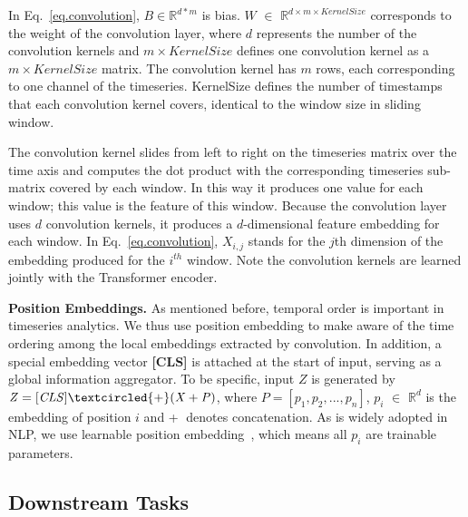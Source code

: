 \begin{sloppypar}

In Eq.~\ref{eq.convolution}, $B \in \mathbb{R}^{d*m}$ is bias. $W$ $\in$ $\mathbb{R}^{d \times m \times KernelSize}$ corresponds to the weight of the convolution layer, where $d$ represents the number of the convolution kernels and $m \times KernelSize$ defines one convolution kernel as a $m \times KernelSize$ matrix. The convolution kernel has $m$ rows, each corresponding to one channel of the timeseries. KernelSize defines the number of timestamps that each convolution kernel covers, identical to the window size in sliding window.  

The convolution kernel slides from left to right on the timeseries matrix over the time axis and computes the dot product with the corresponding timeseries sub-matrix covered by each window. In this way it produces one value for each window;  this value is the feature of this window. 
Because the convolution layer uses $d$ convolution kernels, it produces a $d$-dimensional feature embedding for each window. In Eq.~\ref{eq.convolution}, $X_{i,j}$ stands for the $j$th dimension of the embedding produced for the $i^{th}$ window.
Note the convolution kernels are learned jointly with the Transformer encoder. 

\noindent\textbf{Position Embeddings.}
As mentioned before, temporal order is important in timeseries analytics. We thus use position embedding to make \system aware of the time ordering among the local embeddings extracted by convolution. 
In addition, a special embedding vector \textbf{[CLS]} is attached at the start of input, serving as a global information aggregator.  
To be specific, input $Z$ is generated by $\mathit{Z=[CLS] \textcircled{+} (X+P)}$, where $\mathit{P=[p_1,p_2,...,p_n]}$, $p_i$ $\in$ $\mathbb{R}^d$ is the embedding of position $i$ and \textcircled{+} denotes concatenation. 
As is widely adopted in NLP, we use learnable position embedding~\cite{DBLP:conf/naacl/DevlinCLT19}, which means all $p_i$ are trainable parameters. 

\subsection{Downstream Tasks}
\label{sec.transformer.downstream}


\end{sloppypar}
